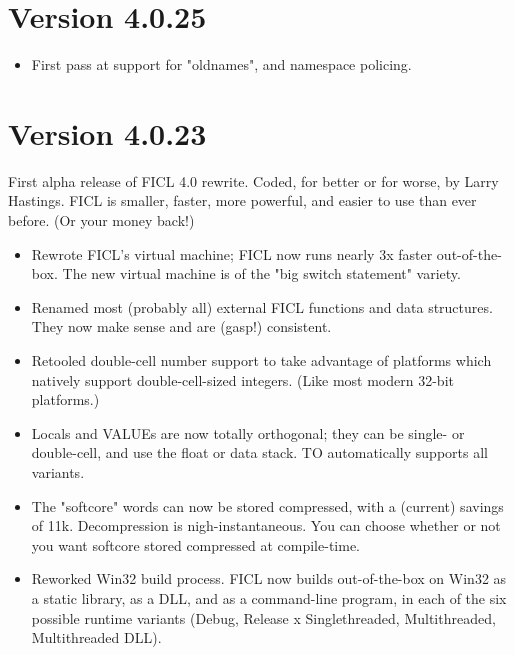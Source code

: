 \section*{Version 4.0.25}
\begin{itemize}[noitemsep]
	\item First pass at support for "oldnames", and namespace
	policing.
\end{itemize}


\section*{Version 4.0.23}
First alpha release of FICL 4.0 rewrite. Coded, for better or for worse,
by Larry Hastings. FICL is smaller, faster, more powerful, and easier to
use than ever before. (Or your money back!)
\begin{itemize}[noitemsep]
	\item Rewrote FICL's virtual machine; FICL now runs nearly 3x
	faster out-of-the-box. The new virtual machine is of the "big
	switch statement" variety.

	\item Renamed most (probably all) external FICL functions and
	data structures. They now make sense and are (gasp!) consistent.

	\item Retooled double-cell number support to take advantage of
	platforms which natively support double-cell-sized integers.
	(Like most modern 32-bit platforms.)

	\item Locals and VALUEs are now totally orthogonal; they can be
	single- or double-cell, and use the float or data stack. TO
	automatically supports all variants.

	\item The "softcore" words can now be stored compressed, with a
	(current) savings of 11k. Decompression is nigh-instantaneous.
	You can choose whether or not you want softcore stored
	compressed at compile-time.

	\item Reworked Win32 build process. FICL now builds
	out-of-the-box on Win32 as a static library, as a DLL, and as a
	command-line program, in each of the six possible runtime
	variants (Debug, Release x Singlethreaded, Multithreaded,
	Multithreaded DLL).
\end{itemize}



